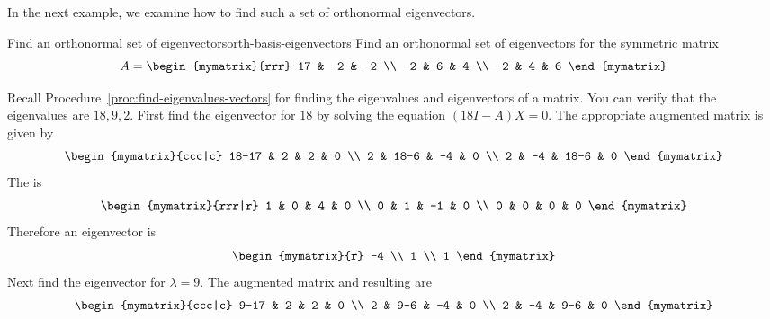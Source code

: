 In the next example, we examine how to find such a set of orthonormal eigenvectors.

\begin{example}{Find an orthonormal set of eigenvectors}{orth-basis-eigenvectors}
Find an orthonormal set of eigenvectors for the symmetric matrix
\begin{equation*}
A = \begin{mymatrix}{rrr}
17 & -2 & -2 \\
-2 & 6 & 4 \\
-2 & 4 & 6
\end{mymatrix}
\end{equation*}
\end{example}

\begin{solution}
Recall Procedure~\ref{proc:find-eigenvalues-vectors} for finding the eigenvalues and eigenvectors of a matrix. You can verify that the eigenvalues are $18,9,2$. First find the eigenvector for $18$ by solving the equation $(18I-A)X = 0$.
The appropriate augmented matrix is given by
\begin{equation*}
\begin{mymatrix}{ccc|c}
18-17 & 2 & 2 & 0 \\
2 & 18-6 & -4 & 0 \\
2 & -4 & 18-6 & 0
\end{mymatrix}
\end{equation*}
The {\rref} is
\begin{equation*}
\begin{mymatrix}{rrr|r}
1 & 0 & 4 & 0 \\
0 & 1 & -1 & 0 \\
0 & 0 & 0 & 0
\end{mymatrix}
\end{equation*}
Therefore an eigenvector is
\begin{equation*}
\begin{mymatrix}{r}
-4 \\
1 \\
1
\end{mymatrix}
\end{equation*}
Next find the eigenvector for $\lambda =9$. The augmented matrix and resulting {\rref} are
\begin{equation*}
\begin{mymatrix}{ccc|c}
9-17 & 2 & 2 & 0 \\
2 & 9-6 & -4 & 0 \\
2 & -4 & 9-6 & 0
\end{mymatrix}

\end{equation*}
\end{solution}
